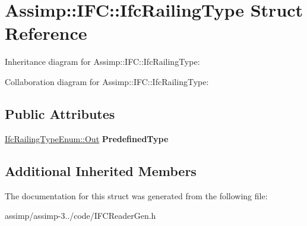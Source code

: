 \hypertarget{struct_assimp_1_1_i_f_c_1_1_ifc_railing_type}{\section{Assimp\+:\+:I\+F\+C\+:\+:Ifc\+Railing\+Type Struct Reference}
\label{struct_assimp_1_1_i_f_c_1_1_ifc_railing_type}
}


Inheritance diagram for Assimp\+:\+:I\+F\+C\+:\+:Ifc\+Railing\+Type\+:


Collaboration diagram for Assimp\+:\+:I\+F\+C\+:\+:Ifc\+Railing\+Type\+:
\subsection*{Public Attributes}
\begin{DoxyCompactItemize}
\item 
\hypertarget{struct_assimp_1_1_i_f_c_1_1_ifc_railing_type_ab919e793ecde246a341a3364d16373b2}{\hyperlink{classboost_1_1shared__ptr}{Ifc\+Railing\+Type\+Enum\+::\+Out} {\bfseries Predefined\+Type}}\label{struct_assimp_1_1_i_f_c_1_1_ifc_railing_type_ab919e793ecde246a341a3364d16373b2}

\end{DoxyCompactItemize}
\subsection*{Additional Inherited Members}


The documentation for this struct was generated from the following file\+:\begin{DoxyCompactItemize}
\item 
assimp/assimp-\/3../code/I\+F\+C\+Reader\+Gen.\+h\end{DoxyCompactItemize}
